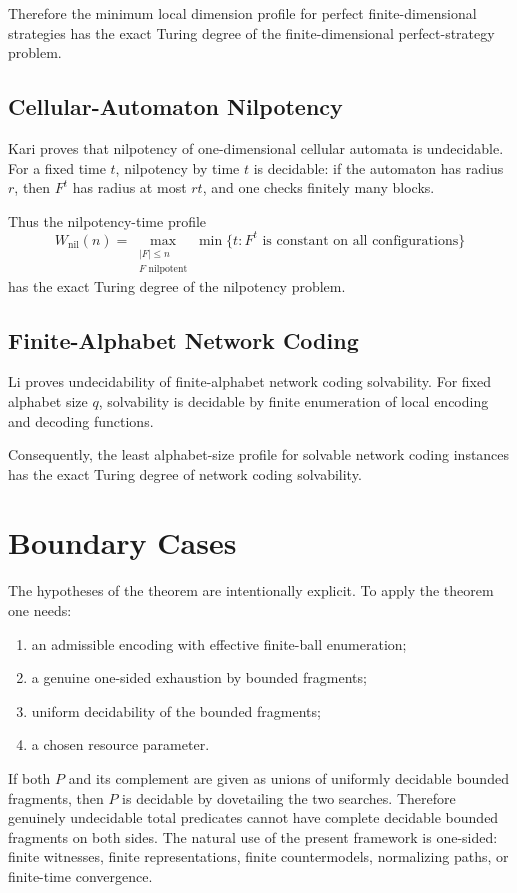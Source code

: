 \documentclass[11pt]{article}
\begin{document}
Therefore the minimum local dimension profile for perfect finite-dimensional strategies has the exact Turing degree of the finite-dimensional perfect-strategy problem.

\subsection{Cellular-Automaton Nilpotency}

Kari proves that nilpotency of one-dimensional cellular automata is undecidable. For a fixed time \(t\), nilpotency by time \(t\) is decidable: if the automaton has radius \(r\), then \(F^t\) has radius at most \(rt\), and one checks finitely many blocks.

Thus the nilpotency-time profile
\[
W_{\mathrm{nil}}(n)
=
\max_{\substack{|F|\le n\\F\text{ nilpotent}}}
\min\{t:F^t\text{ is constant on all configurations}\}
\]
has the exact Turing degree of the nilpotency problem.

\subsection{Finite-Alphabet Network Coding}

Li proves undecidability of finite-alphabet network coding solvability. For fixed alphabet size \(q\), solvability is decidable by finite enumeration of local encoding and decoding functions.

Consequently, the least alphabet-size profile for solvable network coding instances has the exact Turing degree of network coding solvability.

\section{Boundary Cases}

The hypotheses of the theorem are intentionally explicit. To apply the theorem one needs:
\begin{enumerate}[label=(\roman*)]
\item an admissible encoding with effective finite-ball enumeration;
\item a genuine one-sided exhaustion by bounded fragments;
\item uniform decidability of the bounded fragments;
\item a chosen resource parameter.
\end{enumerate}

If both \(P\) and its complement are given as unions of uniformly decidable bounded fragments, then \(P\) is decidable by dovetailing the two searches. Therefore genuinely undecidable total predicates cannot have complete decidable bounded fragments on both sides. The natural use of the present framework is one-sided: finite witnesses, finite representations, finite countermodels, normalizing paths, or finite-time convergence.
\end{document}
